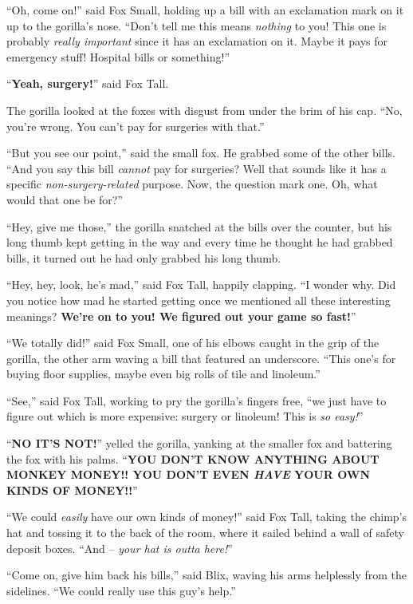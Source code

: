\documentclass[12pt,twoside]{report}
\begin{document}
``Oh, come on!'' said Fox Small, holding up a bill with an exclamation
mark on it up to the gorilla's nose. ``Don't tell me this means {\em
  nothing} to you!  This one is probably {\em really important} since
it has an exclamation on it.  Maybe it pays for emergency stuff!
Hospital bills or something!''

``{\bf Yeah, surgery!}'' said Fox Tall.

The gorilla looked at the foxes with disgust from under the brim of
his cap.  ``No, you're wrong.  You can't pay for surgeries with
that.''

``But you see our point,'' said the small fox.  He grabbed some of the
other bills. ``And you say this bill {\em cannot} pay for surgeries?
Well that sounds like it has a specific {\em non-surgery-related}
purpose.  Now, the question mark one.  Oh, what would that one be
for?''

``Hey, give me those,'' the gorilla snatched at the bills over the
counter, but his long thumb kept getting in the way and every time he
thought he had grabbed bills, it turned out he had only grabbed his
long thumb.

``Hey, hey, look, he's mad,'' said Fox Tall, happily clapping.  ``I
wonder why.  Did you notice how mad he started getting once we
mentioned all these interesting meanings?  {\bf We're on to you!  We
  figured out your game so fast!}''

``We totally did!'' said Fox Small, one of his elbows caught in the
grip of the gorilla, the other arm waving a bill that featured an
underscore. ``This one's for buying floor supplies, maybe even big
rolls of tile and linoleum.''

``See,'' said Fox Tall, working to pry the gorilla's fingers free,
``we just have to figure out which is more expensive: surgery or
linoleum!  This is {\em so easy!}''

``{\bf NO IT'S NOT!}'' yelled the gorilla, yanking at the smaller fox
and battering the fox with his palms.  ``{\bf YOU DON'T KNOW ANYTHING
  ABOUT MONKEY MONEY!!  YOU DON'T EVEN {\em HAVE} YOUR OWN KINDS OF
  MONEY!!}''

``We could {\em easily} have our own kinds of money!'' said Fox Tall,
taking the chimp's hat and tossing it to the back of the room, where
it sailed behind a wall of safety deposit boxes.  ``And -- {\em your
  hat is outta here!}''

``Come on, give him back his bills,'' said Blix, waving his arms
helplessly from the sidelines.  ``We could really use this guy's
help.''
\end{document}
